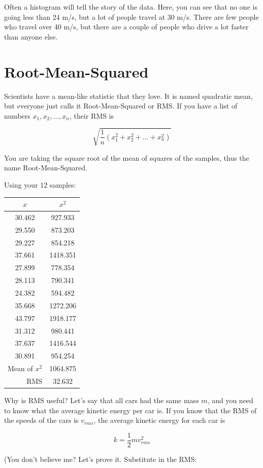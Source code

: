 Often a histogram will tell the story of the data. Here, you can see
that no one is going less than 24 m/s, but a lot of people travel at
30 m/s. There are few people who travel over 40 m/s, but there are a
couple of people who drive a lot faster than anyone else.

\section{Root-Mean-Squared}

Scientists have a mean-like statistic that they love. It is named
quadratic mean, but everyone just calls it Root-Mean-Squared or
RMS. If you have a list of numbers $x_1, x_2, \ldots, x_n$, their RMS
is   

$$\sqrt{\frac{1}{n}\left( x_1^2 + x_2^2 + \ldots + x_n^2 \right)}$$

You are taking the square root of the mean of squares of the samples,
thus the name Root-Mean-Squared.

Using your 12 samples:

\begin{tabular}{c |  c}
  $x$ & $x^2$ \\
  \hline
30.462 & 927.933 \\
29.550 & 873.203\\
29.227 & 854.218\\
37.661 & 1418.351\\
27.899 & 778.354\\
28.113 & 790.341\\
24.382 & 594.482\\
35.668 & 1272.206\\
43.797 & 1918.177\\
31.312 & 980.441\\
37.637 & 1416.544\\
30.891 & 954.254\\
\hline
\multicolumn{1}{r}{Mean of $x^2$} & {1064.875}\\
\multicolumn{1}{r}{RMS} & {32.632}
  \end{tabular}

Why is RMS useful? Let's say that all cars had the same mass $m$, and
you need to know what the average kinetic energy per car is.  If you
know that the RMS of the speeds of the cars is $v_{rms}$, the average kinetic energy for
each car is

$$k = \frac{1}{2}m v_{rms}^2$$

(You don't believe me? Let's prove it. Substitute in the RMS:

